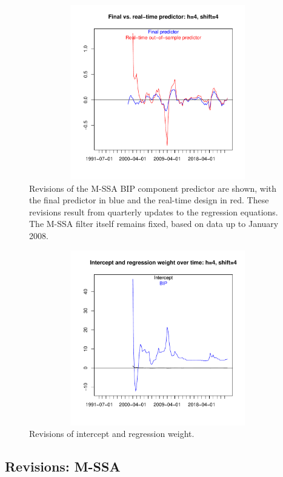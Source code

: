 \documentclass[a4paper]{article}
\begin{document}
\begin{figure}[H]\begin{center}\includegraphics[height=3in, width=4.5in]{./Figures/revisions1.pdf}\caption{Revisions of the M-SSA BIP component predictor are shown, with the final predictor in blue and the real-time design in red. These revisions result from quarterly updates to the regression equations. The M-SSA filter itself remains fixed, based on data up to January 2008.\label{revisions1}}\end{center}\end{figure}\begin{figure}[H]\begin{center}\includegraphics[height=3in, width=4.5in]{./Figures/revisions2.pdf}\caption{Revisions of intercept and regression weight.\label{revisions2}}\end{center}\end{figure}

\subsection{Revisions: M-SSA}
\end{document}
